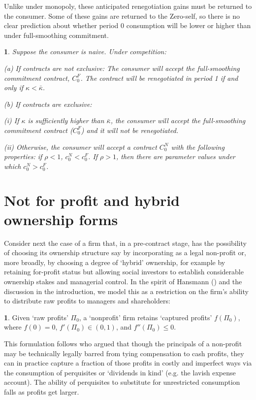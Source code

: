 \documentclass[11pt,english]{article}
\theoremstyle{plain}
\newtheorem{prop}{\protect\propositionname}
\theoremstyle{definition}
\newtheorem*{defn*}{\protect\definitionname}
\providecommand{\definitionname}{Definition}
\providecommand{\propositionname}{Proposition}
\begin{document}
Unlike under monopoly, these anticipated renegotiation gains must
be returned to the consumer. Some of these gains are returned to the
Zero-self, so there is no clear prediction about whether period 0
consumption will be lower or higher than under full-smoothing commitment.
\begin{prop}
Suppose the consumer is naive. Under competition:

(a) If contracts are not exclusive: The consumer will accept the full-smoothing
commitment contract, $C_{0}^{F}$. The contract will be renegotiated
in period 1 if and only if $\kappa<\bar{\kappa}$.

(b) If contracts are exclusive: 

(i) If $\kappa$ is sufficiently higher than $\bar{\kappa}$, the
consumer will accept the full-smoothing commitment contract ($C_{0}^{F}$)
and it will not be renegotiated. 

(ii) Otherwise, the consumer will accept a contract $C_{0}^{N}$ with
the following properties: if $\rho<1$, $c_{0}^{N}<c_{0}^{F}$. If
$\rho>1$, then there are parameter values under which $c_{0}^{N}>c_{0}^{F}$. 
\end{prop}

\section{Not for profit and hybrid ownership forms}\label{nonprofits}

Consider next the case of a firm that, in a pre-contract stage, has
the possibility of choosing its ownership structure say by incorporating
as a legal non-profit or, more broadly, by choosing a degree of `hybrid'
ownership, for example by retaining for-profit status but allowing
social investors to establish considerable ownership stakes and managerial
control. In the spirit of Hansmann () and the discussion in the introduction,
we model this as a restriction on the firm's ability to distribute
raw profits to managers and shareholders:
\begin{defn*}
Given `raw profits' $\Pi_{0}$, a `nonprofit' firm retains `captured
profits' $f\left(\Pi_{0}\right)$, where $f\left(0\right)=0$, $f'\left(\Pi_{0}\right)\in\left(0,1\right)$,
and $f''\left(\Pi_{0}\right)\leq0.$ 
\end{defn*}
This formulation follows \citet{glaeser2001} who
argued that though the principals of a non-profit may be technically
legally barred from tying compensation to cash profits, they can in
practice capture a fraction of those profits in costly and imperfect
ways via the consumption of perquisites or `dividends in kind' (e.g.
the lavish expense account). The ability of perquisites to substitute
for unrestricted consumption falls as profits get larger. 
\end{document}
